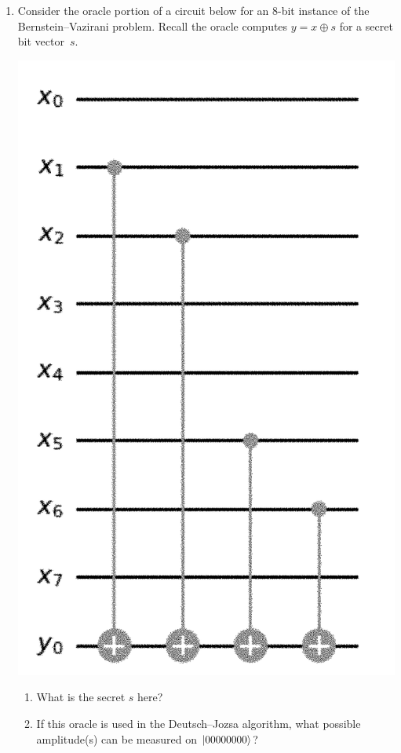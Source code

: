 \documentclass[12pt]{article}
\begin{document}
\begin{enumerate}[font=\bfseries]
    \item {} Consider the oracle portion of a circuit below for an $8$-bit instance of the Bernstein--Vazirani problem.  Recall the oracle computes $y=x\oplus s$ for a secret bit vector~$s$.
 \begin{center}   
    \includegraphics[scale=0.45]{ps250-assets/bv.png}
    \end{center}
\begin{enumerate}[label=\theenumi.\arabic*]
\item What is the secret $s$ here? 
    \item If this oracle is used in the Deutsch--Jozsa algorithm, what possible amplitude(s) can be measured on $\ket{00000000}$?
    

\end{enumerate}
\end{enumerate}
\end{document}
